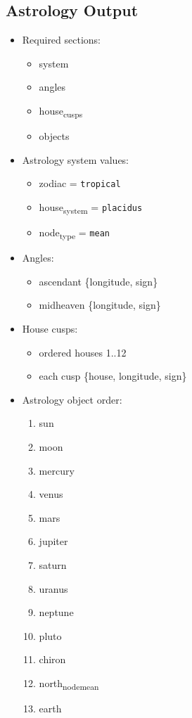 \documentclass[11pt]{article}
\begin{document}
\subsection{Astrology Output}
\label{sec:org7015eb4}
\begin{itemize}
\item Required sections:
\begin{itemize}
\item system
\item angles
\item house\textsubscript{cusps}
\item objects
\end{itemize}
\item Astrology system values:
\begin{itemize}
\item zodiac = \texttt{tropical}
\item house\textsubscript{system} = \texttt{placidus}
\item node\textsubscript{type} = \texttt{mean}
\end{itemize}
\item Angles:
\begin{itemize}
\item ascendant \{longitude, sign\}
\item midheaven \{longitude, sign\}
\end{itemize}
\item House cusps:
\begin{itemize}
\item ordered houses 1..12
\item each cusp \{house, longitude, sign\}
\end{itemize}
\item Astrology object order:
\begin{enumerate}
\item sun
\item moon
\item mercury
\item venus
\item mars
\item jupiter
\item saturn
\item uranus
\item neptune
\item pluto
\item chiron
\item north\textsubscript{node}\textsubscript{mean}
\item earth
\end{enumerate}
\end{itemize}
\end{document}
